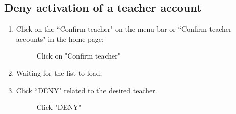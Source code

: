 \documentclass[ManualeUtente]{subfiles}
\begin{document}
\subsection{Deny activation of a teacher account}
\begin{enumerate}
	\item Click on the \textquotedblleft Confirm teacher" on the menu bar or \textquotedblleft Confirm teacher accounts" in the home page;
	\begin{figure}[H]
		\centering
		\caption{Click on "Confirm teacher"}
		\label{fig:Click on "Confirm teacher"}
	\end{figure}
	\item Waiting for the list to load;
	\item Click \textquotedblleft DENY" related to the desired teacher.
	\begin{figure}[H]
		\centering
		\caption{Click "DENY"}
		\label{fig:Click "DENY"}
	\end{figure}
\end{enumerate}
\end{document}

